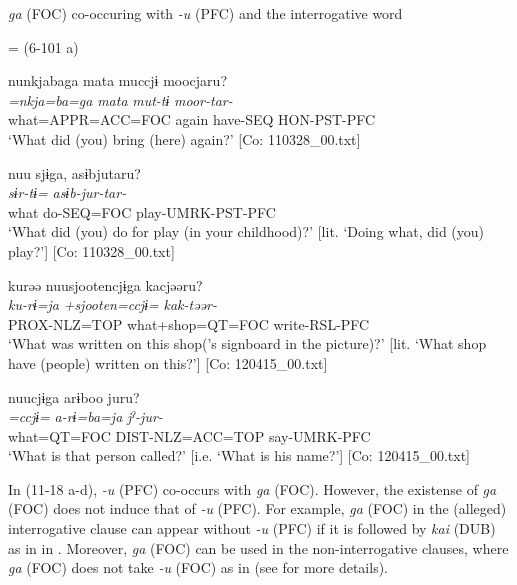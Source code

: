 \ea\label{ex:11-18}  \textit{ga} (FOC) co-occuring with \textit{{}-u} (PFC) and the interrogative word

  \ea{} = (6-101 a)

    
      \glll    nunkjabaga  mata  muccjɨ  moocjaru?\\
      \textit{=nkja=ba=ga}  \textit{mata}  \textit{mut-tɨ}  \textit{moor-tar-}\\
      what=APPR=ACC=FOC  again  have-SEQ  HON-PST-PFC\\
      \glt       ‘What did (you) bring (here) again?’ [Co: 110328\_00.txt]

  \ex  
      \glll    nuu  sjɨga,  asɨbjutaru?\\
      \textit{}  \textit{sɨr-tɨ=}  \textit{asɨb-jur-tar-}\\
      what  do-SEQ=FOC  play-UMRK-PST-PFC\\
      \glt       ‘What did (you) do for play (in your childhood)?’ [lit. ‘Doing what, did (you) play?’] [Co: 110328\_00.txt]

  \ex  
      \glll    kurəə  nuu{\textbar}sjooten{\textbar}cjɨga  kacjəəru?\\
      \textit{ku-rɨ=ja}  \textit{+sjooten=ccjɨ=}  \textit{kak-təər-}\\
      PROX-NLZ=TOP  what+shop=QT=FOC  write-RSL-PFC\\
      \glt        ‘What was written on this shop(’s signboard in the picture)?’ [lit. ‘What shop have (people) written on this?’]  [Co: 120415\_00.txt]

  \ex  
      \glll    nuucjɨga  arɨboo  juru?\\
      \textit{=ccjɨ=}  \textit{a-rɨ=ba=ja}  \textit{jˀ-jur-}\\
      what=QT=FOC  DIST-NLZ=ACC=TOP  say-UMRK-PFC\\
      \glt       ‘What is that person called?’ [i.e. ‘What is his name?’] [Co: 120415\_00.txt]
\z
\z

In (11-18 a-d), \textit{{}-u} (PFC) co-occurs with \textit{ga} (FOC). However, the existense of \textit{ga} (FOC) does not induce that of \textit{{}-u} (PFC). For example, \textit{ga} (FOC) in the (alleged) interrogative clause can appear without \textit{-u} (PFC) if it is followed by \textit{kai} (DUB) as in  in . Moreover, \textit{ga} (FOC) can be used in the non-interrogative clauses, where \textit{ga} (FOC) does not take \textit{{}-u} (FOC) as in  (see  for more details).

